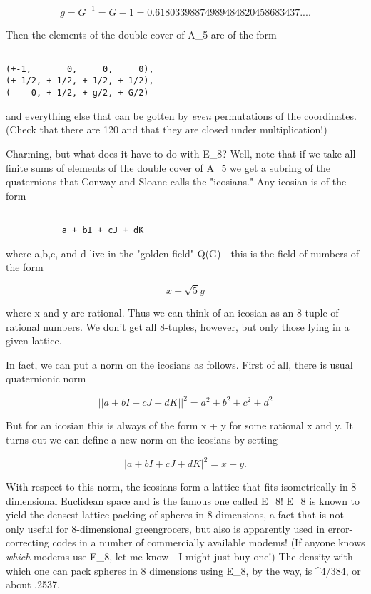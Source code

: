 $$

 g = G^{-1} = G - 1 = 0.61803398874989484820458683437....
$$
    
Then the elements of the double cover of A_{5} are of the form

\begin{verbatim}

(+-1,       0,     0,     0),
(+-1/2, +-1/2, +-1/2, +-1/2),
(    0, +-1/2, +-g/2, +-G/2)
\end{verbatim}
    
and everything else that can be gotten by \emph{even} permutations of the
coordinates.  (Check that there are 120 and that they are closed under
multiplication!)  


Charming, but what does it have to do with E_{8}?  Well, note
that if we take all finite sums of elements of the double cover of 
A_{5} we get a subring of the quaternions that Conway and Sloane 
calls the "icosians."  Any icosian is of the form


\begin{verbatim}

           a + bI + cJ + dK
\end{verbatim}
    

where a,b,c, and d live in the "golden field" Q(G) - this is the field
of numbers of the form


$$

            x + \sqrt 5 y
$$
    

where x and y are rational.  Thus we can think of an icosian as an
8-tuple of rational numbers.  We don't get all 8-tuples, however, but
only those lying in a given lattice.  

In fact, we can put a norm on the icosians as follows.  First of all, 
there is usual quaternionic norm


$$

          ||a + bI + cJ + dK||^{2} = a^{2} + b^{2} + c^{2} + d^{2} 
$$
    

But for an icosian this is always of the form x +  y for some
rational x and y.  It turns out we can define a new norm on the icosians
by setting


$$

          |a + bI + cJ + dK|^{2} = x + y.
$$
    


 With respect to this norm, the icosians form a lattice that fits
isometrically in 8-dimensional Euclidean space and is the famous one
called E_{8}!  E_{8} is known to yield the densest
lattice packing of spheres in 8 dimensions, a fact that is not only
useful for 8-dimensional greengrocers, but also is apparently used in
error-correcting codes in a number of commercially available modems!
(If anyone knows \emph{which} modems use E_{8}, let me know -
I might just buy one!)  The density with which one can pack spheres in 8
dimensions using E_{8}, by the way, is \pi ^{4}/384, 
or about .2537.

